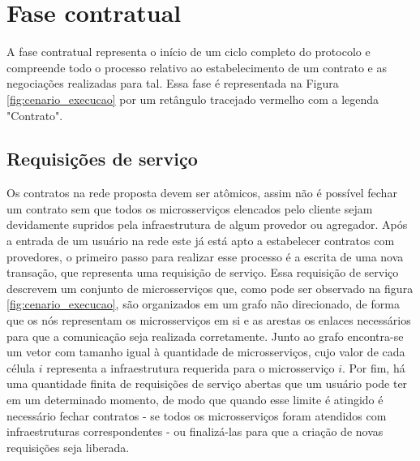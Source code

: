 \section{Fase contratual}
\label{sec:proposta:fase_contratual}

A fase contratual representa o início de um ciclo completo do protocolo e compreende todo o processo relativo ao estabelecimento de um contrato e as negociações realizadas para tal. Essa fase é representada na Figura \ref{fig:cenario_execucao} por um retângulo tracejado vermelho com a legenda "Contrato".


\subsection{Requisições de serviço}
\label{subsec:proposta:contratual:rs}
%
Os contratos na rede proposta devem ser atômicos, assim não é possível fechar um contrato sem que todos os microsserviços elencados pelo cliente sejam devidamente supridos pela infraestrutura de algum provedor ou agregador. Após a entrada de um usuário na rede este já está apto a estabelecer contratos com provedores, o primeiro passo para realizar esse processo é a escrita de uma nova transação, que representa uma requisição de serviço. Essa requisição de serviço descrevem um conjunto de microsserviços que, como pode ser observado na figura \ref{fig:cenario_execucao}, são organizados em um grafo não direcionado, de forma que os nós representam os microsserviços em si e as arestas os enlaces necessários para que a comunicação seja realizada corretamente. Junto ao grafo encontra-se um vetor com tamanho igual à quantidade de microsserviços, cujo valor de cada célula $i$ representa a infraestrutura requerida para o microsserviço $i$. Por fim, há uma quantidade finita de requisições de serviço abertas que um usuário pode ter em um determinado momento, de modo que quando esse limite é atingido é necessário fechar contratos - se todos os microsserviços foram atendidos com infraestruturas correspondentes - ou finalizá-las para que a criação de novas requisições seja liberada.

